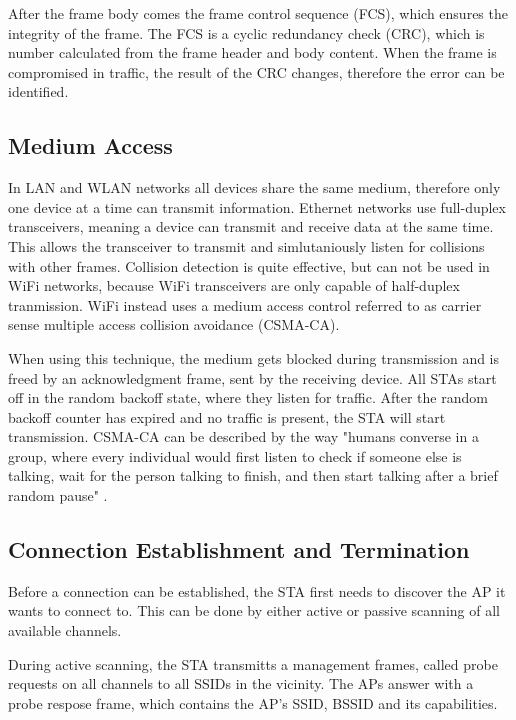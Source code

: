 After the frame body comes the frame control sequence (FCS), which ensures the integrity of the frame.
The FCS is a cyclic redundancy check (CRC), which is number calculated from the frame header and body content.
When the frame is compromised in traffic, the result of the CRC changes, therefore the error can be identified. \cite{GeeksforGeeks_2023} \cite[page~10-12]{Sankaran_Gulasekaran_2021}

\subsection{Medium Access}
In LAN and WLAN networks all devices share the same medium, therefore only one device at a time can transmit information.
Ethernet networks use full-duplex transceivers, meaning a device can transmit and receive data at the same time.
This allows the transceiver to transmit and simlutaniously listen for collisions with other frames.
Collision detection is quite effective, but can not be used in WiFi networks, because WiFi transceivers are only capable of half-duplex tranmission.
WiFi instead uses a medium access control referred to as carrier sense multiple access collision avoidance (CSMA-CA).

When using this technique, the medium gets blocked during transmission and is freed by an acknowledgment frame, sent by the receiving device.
All STAs start off in the random backoff state, where they listen for traffic.
After the random backoff counter has expired and no traffic is present, the STA will start transmission.
CSMA-CA can be described by the way "humans converse in a group, where every individual would first listen to check if someone else is talking, wait for the person talking to finish, and then start talking after a brief random pause" \cite[page~12]{Sankaran_Gulasekaran_2021}. \cite{Oriyano_2017} \cite[page~12-17]{Sankaran_Gulasekaran_2021}

\subsection{Connection Establishment and Termination}
Before a connection can be established, the STA first needs to discover the AP it wants to connect to.
This can be done by either active or passive scanning of all available channels.

During active scanning, the STA transmitts a management frames, called probe requests on all channels to all SSIDs in the vicinity.
The APs answer with a probe respose frame, which contains the AP's SSID, BSSID and its capabilities.

